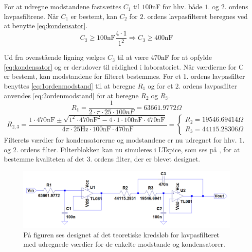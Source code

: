 \noindent For at udregne modstandene fastsættes $C_1$ til $100$nF for hhv. både $1$. og $2$. ordens lavpasfiltrene. Når $C_1$ er bestemt, kan $C_2$ for $2$. ordens lavpasfilteret beregnes ved at benytte \eqref{eq:kondensator}. %
\begin{equation}  
C_3 \geq 100\text{nF} \frac{4\cdot 1}{1^2} \Rightarrow C_3 \geq 400\text{nF}
\end{equation}

\noindent Ud fra ovenstående ligning vælges $C_3$ til at være $470$nF for at opfylde \eqref{eq:kondensator} og er derudover til rådighed i laboratoriet. Når værdierne for C er bestemt, kan modstandene for filteret bestemmes. For et $1$. ordens lavpasfilter benyttes \eqref{eq:1ordenmodstand} til at beregne $R_1$ og for et $2$. ordens lavpasfilter anvendes \eqref{eq:2ordenmodstand} for at beregne $R_2$ og $R_3$. 
\begin{equation} \label{eq:1ordenmodstand}
R_{1} = \frac{1}{2 \cdot \pi \cdot 25 \cdot 100nF} = 63661.9772 \Omega
\end{equation}
\begin{equation}
\label{eq:2ordenmodstand}R_{2,3} = \frac{1 \cdot 470\text{nF} \pm \sqrt{1^2 \cdot 470\text{nF}^2 - 4 \cdot 1 \cdot 100\text{nF} \cdot 470\text{nF}}}{4 \pi \cdot 25\text{Hz} \cdot 100\text{nF} \cdot 470\text{nF}} = \begin{cases} R_{2} = 19546.69414 \Omega \\ R_{3} =  44115.28306 \Omega \end{cases}
\end{equation}
\noindent Filterets værdier for kondensatorerne og modstandene er nu udregnet for hhv. $1$. og $2$. ordens filter. Filterblokken kan nu simuleres i LTspice, som ses på , for at bestemme kvaliteten af det $3$. ordens filter, der er blevet designet.

\begin{figure}[H]
	\centering
	\includegraphics[scale=0.35]{figures/cProblemloesning/Lavpasfilter1_LTspice.PNG}
	\caption{På figuren ses designet af det teoretiske kredsløb for lavpasfilteret med udregnede værdier for de enkelte modstande og kondensatorer.}
	\label{fig:lavpasfilter1_LTspice}
\end{figure}

